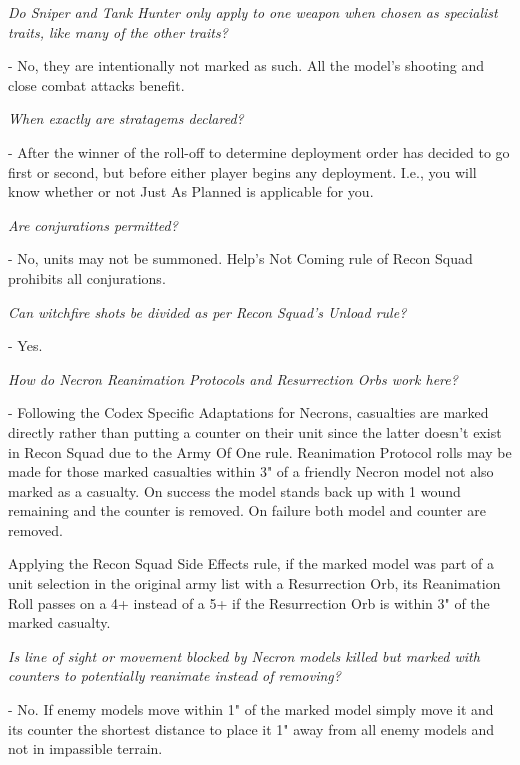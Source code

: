 \begin{multicols}{2}
  \smallskip\noindent\emph{Do Sniper and Tank Hunter only apply to one
    weapon when chosen as specialist traits, like many of the other
    traits?}

- No, they are intentionally not marked as such.  All the model's
  shooting and close combat attacks benefit.

\smallskip\noindent\emph{When exactly are stratagems declared?}

- After the winner of the roll-off to determine deployment order has
  decided to go first or second, but before either player begins any
  deployment.  I.e., you will know whether or not Just As Planned is
  applicable for you.

\bigskip{}%

\smallskip\noindent\emph{Are conjurations permitted?}

- No, units may not be summoned.  Help's Not Coming rule of Recon
  Squad prohibits all conjurations.

\smallskip\noindent\emph{Can witchfire shots be divided as per Recon Squad's Unload rule?}

- Yes.

\bigskip{}%

\smallskip\noindent\emph{How do Necron Reanimation Protocols and
  Resurrection Orbs work here?}

- Following the Codex Specific Adaptations for Necrons, casualties are
  marked directly rather than putting a counter on their unit since
  the latter doesn't exist in Recon Squad due to the Army Of One rule.
  Reanimation Protocol rolls may be made for those marked casualties
  within 3" of a friendly Necron model not also marked as a casualty.
  On success the model stands back up with 1 wound remaining and the
  counter is removed.  On failure both model and counter are removed.

  Applying the Recon Squad Side Effects rule, if the marked model was
  part of a unit selection in the original army list with a
  Resurrection Orb, its Reanimation Roll passes on a 4+ instead of a
  5+ if the Resurrection Orb is within 3" of the marked casualty.

  \smallskip\noindent\emph{Is line of sight or movement blocked by
    Necron models killed but marked with counters to potentially
    reanimate instead of removing?}

- No.  If enemy models move within 1" of the marked model simply move
  it and its counter the shortest distance to place it 1" away from
  all enemy models and not in impassible terrain.



\end{multicols}
